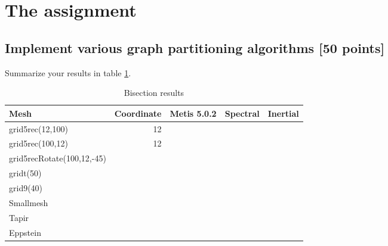 \documentclass[unicode,11pt,a4paper,oneside,numbers=endperiod,openany]{scrartcl}
\begin{document}
\setassignment
{}

\newline

\assignmentpolicy

\newpage

\section{The assignment}

\subsection{Implement various graph partitioning algorithms [50 points]}
Summarize your results in table \ref{table:bisection}.


\begin{table}[h]
\caption{Bisection results}
\centering
\begin{tabular}{l|r|r|r|r} \hline\hline 
Mesh             &  Coordinate           & Metis 5.0.2  & Spectral & Inertial  \\ \hline
grid5rec(12,100)&   12                   &             &          &           \\             
grid5rec(100,12)&   12                   &             &          &           \\ 
grid5recRotate(100,12,-45)&              &             &          &           \\ 
gridt(50)        &                        &             &          &           \\ 
grid9(40)        &                        &             &          &           \\ 
Smallmesh            &                        &             &          &           \\ 
Tapir            &                        &             &          &           \\ 
Eppstein            &                        &             &          &           \\  
\hline \hline
\end{tabular}
\label{table:bisection}
\end{table}

\end{document}
